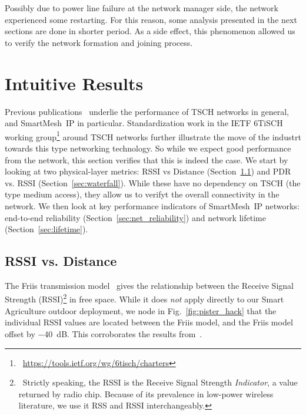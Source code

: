 \documentclass{sig-alternate}
\newcommand{\smip}                {SmartMesh~IP\xspace}
\begin{document}
Possibly due to power line failure at the network manager side, the network experienced some restarting.
For this reason, some analysis presented in the next sections are done in shorter period.
As a side effect, this phenomenon allowed us to verify the network formation and joining process.

\section{Intuitive Results}
\label{sec:intuitive}

Previous publications~\cite{watteyne16peach,watteyne10mitigating,watteyne09reliability,watteyne15industrial} underlie the performance of TSCH networks in general, and \smip in particular.
Standardization work in the IETF 6TiSCH working group\footnote{~\url{https://tools.ietf.org/wg/6tisch/charters}} around TSCH networks further illustrate the move of the industrt towards this type networking technology.
So while we expect good performance from the network, this section verifies that this is indeed the case.
We start by looking at two physical-layer metrics: RSSI vs Distance (Section~\ref{sec:rssi_distance}) and PDR vs. RSSI (Section~\ref{sec:waterfall}).
While these have no dependency on TSCH (the type medium access), they allow us to verifyt the overall connectivity in the network.
We then look at key performance indicators of \smip networks: end-to-end reliability (Section~\ref{sec:net_reliability}) and network lifetime (Section~\ref{sec:lifetime}).

\subsection{RSSI vs. Distance}
\label{sec:rssi_distance}

The Friis transmission model~\cite{saunders07antennas} gives the relationship between the Receive Signal Strength (RSSI)\footnote{~Strictly speaking, the RSSI is the Receive Signal Strength \textit{Indicator}, a value returned by radio chip. Because of its prevalence in low-power wireless literature, we use it RSS and RSSI interchangeably.} in free space.
While it does \textit{not} apply directly to our Smart Agriculture outdoor deployment, we node in Fig.~\ref{fig:pister_hack} that the individual RSSI values are located between the Friis model, and the Friis model offset by $-$40~dB.
This corroborates the results from~\cite{zats10wireless}.
\end{document}
